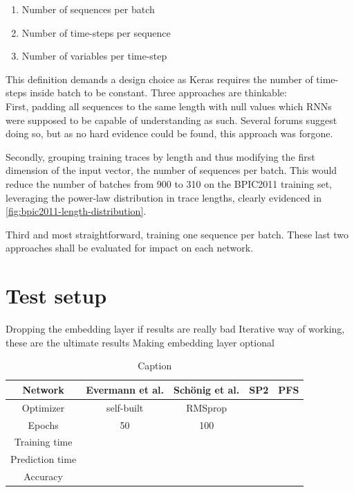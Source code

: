 \begin{enumerate}
    \item Number of sequences per batch
    \item Number of time-steps per sequence
    \item Number of variables per time-step
\end{enumerate}

This definition demands a design choice as Keras requires the number of time-steps inside batch to be constant. Three approaches are thinkable:\\

First, padding all sequences to the same length with null values which RNNs were supposed to be capable of understanding as such. Several forums suggest doing so, but as no hard evidence could be found, this approach was forgone.

Secondly, grouping training traces by length and thus modifying the first dimension of the input vector, the number of sequences per batch. This would reduce the number of batches from 900 to 310 on the BPIC2011 training set, leveraging the power-law distribution in trace lengths, clearly evidenced in \autoref{fig:bpic2011-length-distribution}.

Third and most straightforward, training one sequence per batch. These last two approaches shall be evaluated for impact on each network.

\section{Test setup}
Dropping the embedding layer if results are really bad
Iterative way of working, these are the ultimate results
Making embedding layer optional

\begin{table}[]
    \centering
    \begin{tabular}{c|cccc}
        Network & Evermann et al. & Schönig et al. & SP2 & PFS\\
        \hline
        Optimizer & self-built & RMSprop  & \\
        Epochs  & 50    & 100 & \\
        Training time\\
        Prediction time\\
        Accuracy\\
    \end{tabular}
    \caption{Caption}
    \label{tab:my_label}
\end{table}

